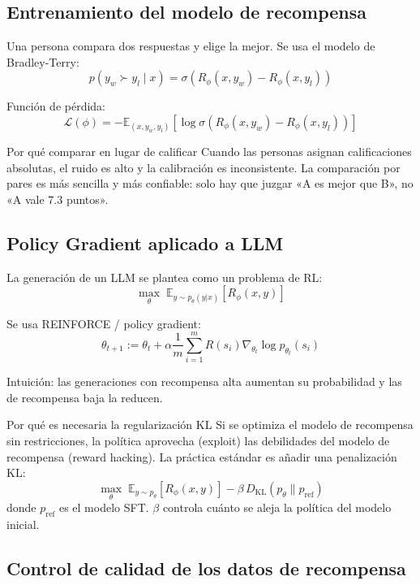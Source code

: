 \documentclass[a4paper]{article}
\begin{document}
\subsection{Entrenamiento del modelo de recompensa}

Una persona compara dos respuestas y elige la mejor. Se usa el modelo de Bradley-Terry:
$$p(y_w \succ y_l \mid x) = \sigma(R_\phi(x, y_w) - R_\phi(x, y_l))$$

Función de pérdida:
$$\mathcal{L}(\phi) = -\mathbb{E}_{(x, y_w, y_l)}\left[\log \sigma(R_\phi(x, y_w) - R_\phi(x, y_l))\right]$$

\begin{knowledgebox}{Por qué comparar en lugar de calificar}
Cuando las personas asignan calificaciones absolutas, el ruido es alto y la calibración es inconsistente. La comparación por pares es más sencilla y más confiable: solo hay que juzgar «A es mejor que B», no «A vale 7.3 puntos».
\end{knowledgebox}

\subsection{Policy Gradient aplicado a LLM}

La generación de un LLM se plantea como un problema de RL:
$$\max_\theta \; \mathbb{E}_{y \sim p_\theta(y|x)} \left[R_\phi(x, y)\right]$$

Se usa REINFORCE / policy gradient:
$$\theta_{t+1} := \theta_t + \alpha \frac{1}{m}\sum_{i=1}^{m} R(s_i) \nabla_{\theta_t} \log p_{\theta_t}(s_i)$$

Intuición: las generaciones con recompensa alta aumentan su probabilidad y las de recompensa baja la reducen.

\begin{warningbox}{Por qué es necesaria la regularización KL}
Si se optimiza el modelo de recompensa sin restricciones, la política aprovecha (exploit) las debilidades del modelo de recompensa (reward hacking). La práctica estándar es añadir una penalización KL:
$$\max_\theta \; \mathbb{E}_{y \sim p_\theta}\left[R_\phi(x, y)\right] - \beta \, D_{\mathrm{KL}}(p_\theta \| p_{\mathrm{ref}})$$
donde $p_{\mathrm{ref}}$ es el modelo SFT. $\beta$ controla cuánto se aleja la política del modelo inicial.
\end{warningbox}

\subsection{Control de calidad de los datos de recompensa}
\end{document}
